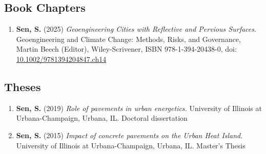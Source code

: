 \documentclass[12pt]{article}
\begin{document}
\hfill
\subsection*{Book Chapters}
\begin{enumerate}
	\item \textbf{Sen, S.} (2025) \textit{Geoengineering Cities with Reflective and Pervious Surfaces}. Geoengineering and Climate Change: Methods, Risks, and Governance, Martin Beech (Editor), Wiley-Scrivener, ISBN 978-1-394-20438-0, doi: \href{http://dx.doi.org/10.1002/9781394204847.ch14}{10.1002/9781394204847.ch14}
\end{enumerate}

\hfill
\subsection*{Theses}
\begin{enumerate}
	\item \textbf{Sen, S.} (2019) \textit{Role of pavements in urban energetics.} University of Illinois at Urbana-Champaign, Urbana, IL. Doctoral dissertation
	\item \textbf{Sen, S.} (2015) \textit{Impact of concrete pavements on the 		Urban Heat Island.} University of Illinois at Urbana-Champaign, Urbana, IL. Master’s Thesis
\end{enumerate}

\hfill
\end{document}
